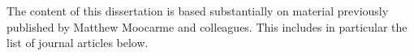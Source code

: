 \nobibliography* 
The content of this dissertation is based substantially on material previously published by Matthew Moocarme and colleagues. This includes in particular the list of journal articles below.
\vspace{5mm}

\noindent
{}
\vspace{5mm}

\noindent
{}
\vspace{5mm}

\noindent
{}
\vspace{5mm}

\noindent
{}